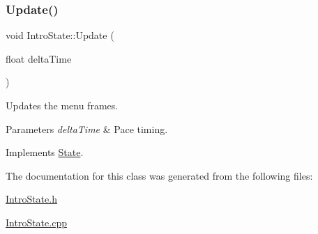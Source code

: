 \subsubsection{\texorpdfstring{Update()}{Update()}}
{\footnotesize\ttfamily void Intro\+State\+::\+Update (\begin{DoxyParamCaption}\item[{float}]{delta\+Time }\end{DoxyParamCaption})\hspace{0.3cm}{\ttfamily [virtual]}}



Updates the menu frames. 


\begin{DoxyParams}{Parameters}
{\em delta\+Time} & Pace timing. \\
\hline
\end{DoxyParams}


Implements \mbox{\hyperlink{classState_a770f40188fdfc64bc95a5166fef12e02}{State}}.



The documentation for this class was generated from the following files\+:\begin{DoxyCompactItemize}
\item 
\mbox{\hyperlink{IntroState_8h}{Intro\+State.\+h}}\item 
\mbox{\hyperlink{IntroState_8cpp}{Intro\+State.\+cpp}}\end{DoxyCompactItemize}
